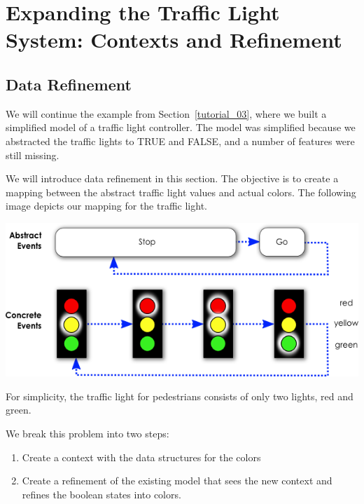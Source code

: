 \section{Expanding the Traffic Light System: Contexts and Refinement}
\label{tutorial_07}


\subsection{Data Refinement}
\label{tutorial:data_refinement}

We will continue the example from Section~\ref{tutorial_03}, where we built a simplified model of a traffic light controller.  The model was simplified because we abstracted the traffic lights to TRUE and FALSE, and a number of features were still missing.

We will introduce data refinement in this section.  The objective is to create a mapping between the abstract traffic light values and actual colors.  The following image depicts our mapping for the traffic light.

\begin{center}
	\includegraphics{img/tutorial/tl-colors.png}
	\label{fig:tl-colors}
\end{center}

For simplicity, the traffic light for pedestrians consists of only two lights, red and green.

We break this problem into two steps:

\begin{enumerate}
	\item Create a context with the data structures for the colors
	\item Create a refinement of the existing model that sees the new context and refines the boolean states into colors.
\end{enumerate}

